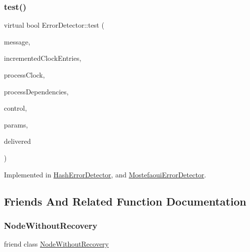 \subsubsection{\texorpdfstring{test()}{test()}}
{\footnotesize\ttfamily virtual bool Error\+Detector\+::test (\begin{DoxyParamCaption}\item[{\hyperlink{structures_8h_a7e7bdc1d2fff8a9436f2f352b2711ed6}{message\+Info}}]{message,  }\item[{const vector$<$ unsigned int $>$ \&}]{incremented\+Clock\+Entries,  }\item[{const \hyperlink{class_probabilistic_clock}{Probabilistic\+Clock} \&}]{process\+Clock,  }\item[{const \hyperlink{class_total_dependencies}{Total\+Dependencies} \&}]{process\+Dependencies,  }\item[{\hyperlink{class_controller}{Controller} $\ast$}]{control,  }\item[{\hyperlink{class_simulation_parameters}{Simulation\+Parameters} $\ast$}]{params,  }\item[{const vector$<$ \hyperlink{structures_8h_a7e7bdc1d2fff8a9436f2f352b2711ed6}{message\+Info} $>$ \&}]{delivered }\end{DoxyParamCaption})\hspace{0.3cm}{\ttfamily [pure virtual]}}



Implemented in \hyperlink{class_hash_error_detector_a1c7fe649a34cf7e139ce53a248dce748}{Hash\+Error\+Detector}, and \hyperlink{class_mostefaoui_error_detector_a293f6cf144526bc8694fc4f1fc0daeb5}{Mostefaoui\+Error\+Detector}.



\subsection{Friends And Related Function Documentation}
\mbox{\label{class_error_detector_aa0495b79e94b09962892b921ae370e57}} 
\subsubsection{\texorpdfstring{Node\+Without\+Recovery}{NodeWithoutRecovery}}
{\footnotesize\ttfamily friend class \hyperlink{class_node_without_recovery}{Node\+Without\+Recovery}\hspace{0.3cm}{\ttfamily [friend]}}

